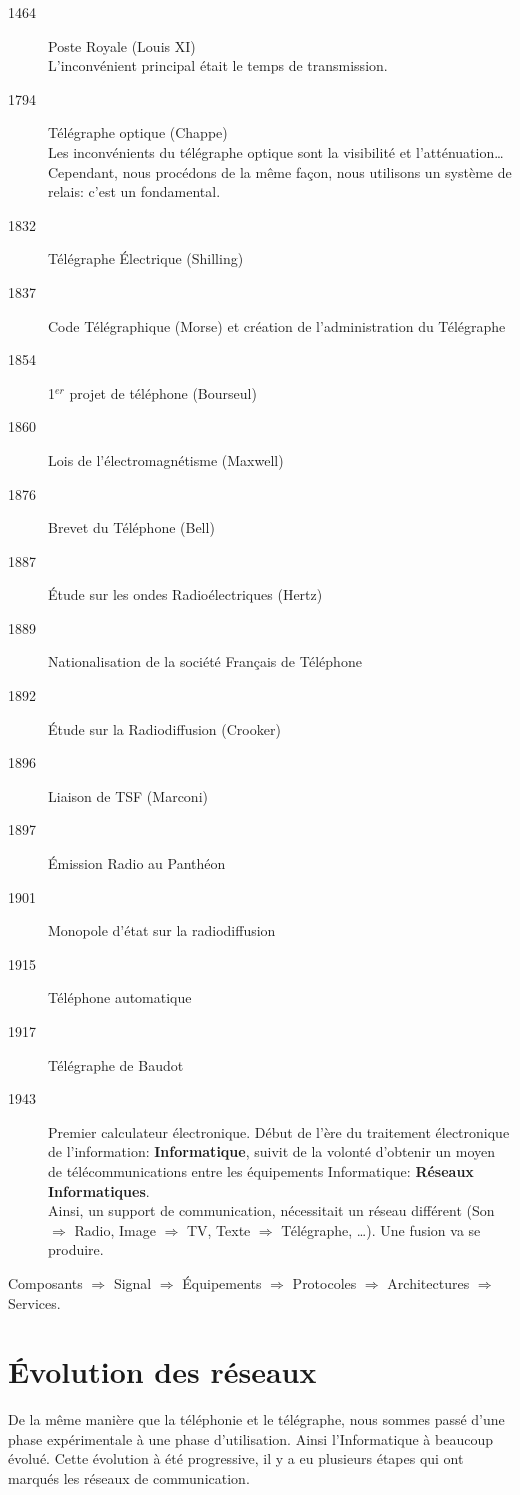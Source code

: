 \documentclass[12pt,a4paper,openany]{book}
\begin{document}
			\begin{description}
				\item[1464] Poste Royale (Louis XI)\\
					L'inconvénient principal était le temps de transmission.
				\item[1794] Télégraphe optique (Chappe)\\
			Les inconvénients du télégraphe optique sont la visibilité et l'atténuation\ldots Cependant, nous procédons de la même façon, nous utilisons un système de relais: c'est un fondamental.
				\item[1832] Télégraphe \'Electrique (Shilling)
				\item[1837] Code Télégraphique (Morse) et création de l'administration du Télégraphe
				\item[1854] 1$^{er}$ projet de téléphone (Bourseul)
				\item[1860] Lois de l'électromagnétisme (Maxwell)
				\item[1876] Brevet du Téléphone (Bell)
				\item[1887] \'Etude sur les ondes Radioélectriques (Hertz)
				\item[1889] Nationalisation de la société Français de Téléphone
				\item[1892] \'Etude sur la Radiodiffusion (Crooker)
				\item[1896] Liaison de TSF (Marconi)
				\item[1897] \'Emission Radio au Panthéon
				\item[1901] Monopole d'état sur la radiodiffusion
				\item[1915] Téléphone automatique
				\item[1917] Télégraphe de Baudot
				\item[1943] Premier calculateur électronique. Début de l'ère du traitement électronique de l'information: \textbf{Informatique}, 
					suivit de la volonté d'obtenir un moyen de télécommunications entre les équipements Informatique: \textbf{Réseaux Informatiques}.\\ Ainsi, un support de communication, nécessitait un réseau différent (Son $\Rightarrow$ Radio, Image $\Rightarrow$ TV, Texte $\Rightarrow$ Télégraphe, \ldots). Une fusion va se produire.
			\end{description}

			Composants $\Rightarrow$ Signal $\Rightarrow$ Équipements $\Rightarrow$ Protocoles $\Rightarrow$ Architectures $\Rightarrow$ Services.

	\chapter{\'Evolution des réseaux}
			De la même manière que la téléphonie et le télégraphe, nous sommes passé d'une phase expérimentale à une phase d'utilisation. Ainsi l'Informatique à beaucoup évolué. Cette évolution à été progressive, il y a eu plusieurs étapes qui ont marqués les réseaux de communication.
\end{document}
